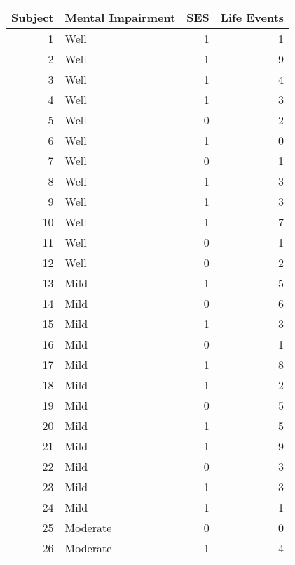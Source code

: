 \begin{tabular}{rlrr}
\toprule
 Subject & Mental Impairment &  SES &  Life Events \\
\midrule
       1 &              Well &    1 &            1 \\
       2 &              Well &    1 &            9 \\
       3 &              Well &    1 &            4 \\
       4 &              Well &    1 &            3 \\
       5 &              Well &    0 &            2 \\
       6 &              Well &    1 &            0 \\
       7 &              Well &    0 &            1 \\
       8 &              Well &    1 &            3 \\
       9 &              Well &    1 &            3 \\
      10 &              Well &    1 &            7 \\
      11 &              Well &    0 &            1 \\
      12 &              Well &    0 &            2 \\
      13 &              Mild &    1 &            5 \\
      14 &              Mild &    0 &            6 \\
      15 &              Mild &    1 &            3 \\
      16 &              Mild &    0 &            1 \\
      17 &              Mild &    1 &            8 \\
      18 &              Mild &    1 &            2 \\
      19 &              Mild &    0 &            5 \\
      20 &              Mild &    1 &            5 \\
      21 &              Mild &    1 &            9 \\
      22 &              Mild &    0 &            3 \\
      23 &              Mild &    1 &            3 \\
      24 &              Mild &    1 &            1 \\
      25 &          Moderate &    0 &            0 \\
      26 &          Moderate &    1 &            4 \\

\end{tabular}
